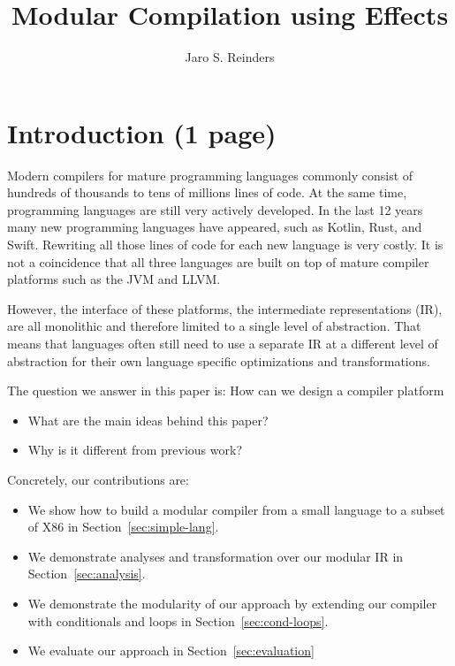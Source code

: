 \documentclass[sigplan,anonymous,review]{acmart}
\title{Modular Compilation using Effects}
\author{Jaro S. Reinders} %
\begin{document}
\begin{abstract}

\end{abstract}

\maketitle

\section{Introduction (1 page)} \label{sec:intro}

Modern compilers for mature programming languages commonly consist of hundreds of thousands to tens of millions lines of code.
At the same time, programming languages are still very actively developed.
In the last 12 years many new programming languages have appeared, such as Kotlin, Rust, and Swift.
Rewriting all those lines of code for each new language is very costly.
It is not a coincidence that all three languages are built on top of mature compiler platforms such as the JVM and LLVM.

However, the interface of these platforms, the intermediate representations (IR), are all monolithic and therefore limited to a single level of abstraction.
That means that languages often still need to use a separate IR at a different level of abstraction for their own language specific optimizations and transformations.

The question we answer in this paper is: How can we design a compiler platform 

\begin{itemize}
  \item What are the main ideas behind this paper?
  \item Why is it different from previous work?
\end{itemize}

Concretely, our contributions are:
\begin{itemize}
  \item We show how to build a modular compiler from a small language to a subset of X86 in Section~\ref{sec:simple-lang}.
  \item We demonstrate analyses and transformation  over our modular IR in Section~\ref{sec:analysis}.
  \item We demonstrate the modularity of our approach by extending our compiler with conditionals and loops in Section~\ref{sec:cond-loops}.
  \item We evaluate our approach in Section~\ref{sec:evaluation}
\end{itemize}
\end{document}
